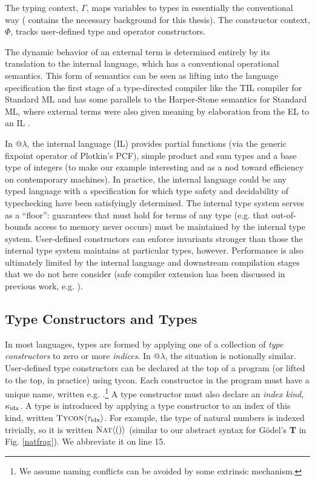 The typing context, $\Gamma$, maps variables to types in essentially the conventional way (\cite{pfpl} contains the necessary background for this thesis). The constructor context, $\Phi$, tracks user-defined type and operator constructors. %

The dynamic behavior of an external term is determined entirely by its translation to the internal language, which has a conventional operational semantics. This form of semantics can be seen as lifting into the language specification the first stage of a type-directed compiler like the TIL compiler for Standard ML \cite{tarditi+:til-OLD} and has some parallels to the Harper-Stone semantics for Standard ML, where external terms were also given meaning by elaboration from the EL to an IL \cite{Harper00atype-theoretic}. %

In @$\lambda$, the internal language (IL) provides partial functions (via the generic fixpoint operator of Plotkin's PCF), simple product and sum types and a base type of integers (to make our example interesting and as a nod toward efficiency on contemporary machines). In practice, the internal language could be any typed  language with a specification for which type safety and decidability of typechecking have been satisfyingly determined. The internal type system serves as a ``floor'': guarantees that must hold for terms of any type (e.g. that out-of-bounds access to memory never occurs) must be maintained by the internal type system. User-defined constructors can enforce invariants stronger than those the internal type system maintains at particular types, however. Performance is also ultimately limited by the internal language and downstream compilation stages that we do not here consider (safe compiler extension has been discussed in previous work, e.g. \cite{conf/pldi/TatlockL10}).


\subsection{Type Constructors and Types}\label{types}
In most languages, types are formed by applying one of a collection of \emph{type constructors} to zero or more \emph{indices}. In @$\lambda$, the situation is notionally similar. User-defined type constructors can be declared at the top of a program (or lifted to the top, in practice) using \textsf{tycon}. Each constructor in the program must have a unique name, written e.g. .\footnote{We assume naming conflicts can be avoided by some extrinsic mechanism.} A type constructor must also declare an \emph{index kind}, $\kappa_{\text{idx}}$. A type is introduced by applying a type constructor to an index of this kind, written $\textsc{Tycon}\langle{\tau_{\text{idx}}}\rangle$.  For example, the type of natural numbers is indexed trivially, so it is written $\textsc{Nat}\langle()\rangle$ (similar to our abstract syntax for G\"odel's \textbf{T} in Fig. \ref{natfrag}). We abbreviate it on line 15.

